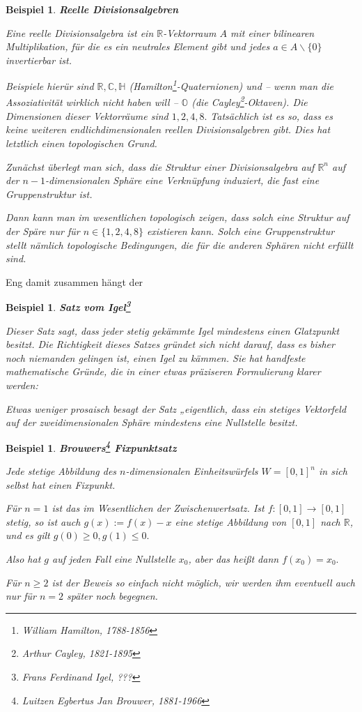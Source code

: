 \documentclass[12pt]{scrbook}   %
\newtheorem{bsp}[alles]{Beispiel}
\begin{document}
\begin{bsp} {\bf Reelle Divisionsalgebren}

{\rm Eine reelle Divisionsalgebra ist ein $\mathbb R$-Vektorraum $A$ mit einer
bilinearen Multiplikation, für die es ein neutrales Element gibt und jedes
$a\in A\smallsetminus\{0\}$ invertierbar ist. 

Beispiele hierür sind $\mathbb R,\mathbb C, \mathbb H$ 
(Hamilton\footnote{William Hamilton, 1788-1856}-Quaternionen) und -- wenn man 
die Assoziativität wirklich nicht haben will -- $\mathbb O$ (die 
Cayley\footnote{Arthur Cayley, 1821-1895}-Oktaven). Die Dimensionen dieser 
Vektorräume sind $1,2,4,8.$ Tatsächlich ist es so, dass es keine weiteren
endlichdimensionalen reellen Divisionsalgebren gibt. Dies
hat letztlich einen topologischen Grund. 

Zunächst überlegt man sich, dass die Struktur einer Divisionsalgebra auf 
$\mathbb R^n$ auf der $n-1$-dimensionalen Sphäre eine Verknüpfung
induziert, die fast eine Gruppenstruktur ist.

Dann kann man im wesentlichen topologisch zeigen, dass solch eine Struktur
auf der Späre nur für
$n\in\{1,2,4,8\}$ existieren kann. Solch eine Gruppenstruktur stellt nämlich 
topologische Bedingungen, die für die anderen Sphären nicht erfüllt sind.
}\end{bsp}



Eng damit zusammen hängt der

\begin{bsp} {\bf Satz vom Igel\footnote{Frans Ferdinand Igel, ???}}

{\rm Dieser Satz sagt, dass jeder stetig gekämmte Igel mindestens einen 
Glatzpunkt besitzt. Die Richtigkeit dieses Satzes gründet sich nicht darauf, 
dass es bisher noch niemanden gelingen ist, einen Igel zu kämmen. Sie hat
handfeste mathematische Gründe, die in einer etwas präziseren Formulierung 
klarer werden:

Etwas weniger prosaisch besagt der Satz „eigentlich\grqq, dass ein 
stetiges Vektorfeld auf der zweidimensionalen Sphäre mindestens eine
Nullstelle besitzt.
}
\end{bsp}

\begin{bsp} {\bf Brouwers\footnote{Luitzen Egbertus Jan Brouwer, 1881-1966}
Fixpunktsatz}

{\rm Jede stetige Abbildung des $n$-dimensionalen Einheitswürfels 
$W=[0,1]^n$ in sich selbst hat einen Fixpunkt.

Für $n=1$ ist das im Wesentlichen der Zwischenwertsatz. Ist $f:[0,1]
\longrightarrow [0,1]$ stetig, so ist auch $g(x) := f(x)-x$ eine stetige 
Abbildung von $[0,1]$ nach $\mathbb R$, und es gilt $g(0)\geq 0, g(1)\leq 0.$

Also hat $g$ auf jeden Fall eine Nullstelle $x_0$, aber das heißt dann 
$f(x_0) = x_0.$

Für $n\geq 2$ ist der Beweis so einfach nicht möglich, wir werden ihm 
eventuell auch nur für $n=2$ später noch begegnen.
}
\end{bsp}
\end{document}
